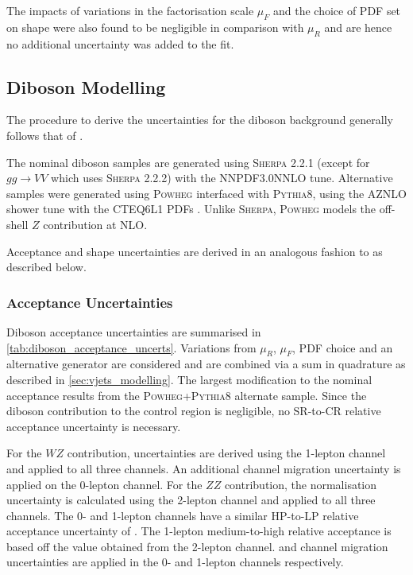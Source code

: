 The impacts of variations in the factorisation scale $\mu_{F}$ and the choice of PDF set on \mJ shape were also found to be negligible in comparison with $\mu_{R}$ and are hence no additional uncertainty was added to the fit.


\subsection{Diboson Modelling}

The procedure to derive the uncertainties for the diboson background generally follows that of \Vjets.

The nominal diboson samples are generated using \textsc{Sherpa} 2.2.1 (except for $gg\rightarrow VV$ which uses \textsc{Sherpa} 2.2.2) with the NNPDF3.0NNLO tune.
Alternative samples were generated using \textsc{Powheg} interfaced with \textsc{Pythia8}, using the AZNLO shower tune with the CTEQ6L1 PDFs \cite{Pumplin:2002:CTEQ6L1}.
Unlike \textsc{Sherpa}, \textsc{Powheg} models the off-shell $Z$ contribution at NLO.

Acceptance and shape uncertainties are derived in an analogous fashion to \Vjets as described below.

\subsubsection{Acceptance Uncertainties}

Diboson acceptance uncertainties are summarised in \cref{tab:diboson_acceptance_uncerts}.
Variations from $\mu_R$, $\mu_F$, PDF choice and an alternative generator are considered and are combined via a sum in quadrature as described in \cref{sec:vjets_modelling}.
The largest modification to the nominal acceptance results from the \textsc{Powheg+Pythia8} alternate sample.
Since the diboson contribution to the \ttbar control region is negligible, no SR-to-CR relative acceptance uncertainty is necessary.

For the $WZ$ contribution, uncertainties are derived using the 1-lepton channel and applied to all three channels.
An additional  channel migration uncertainty is applied on the 0-lepton channel.
For the $ZZ$ contribution, the normalisation uncertainty is calculated using the 2-lepton channel and applied to all three channels.
The 0- and 1-lepton channels have a similar HP-to-LP relative acceptance uncertainty of .
The 1-lepton medium-to-high \ptv relative acceptance is based off the value obtained from the 2-lepton channel.
 and  channel migration uncertainties are applied in the 0- and 1-lepton channels respectively.

